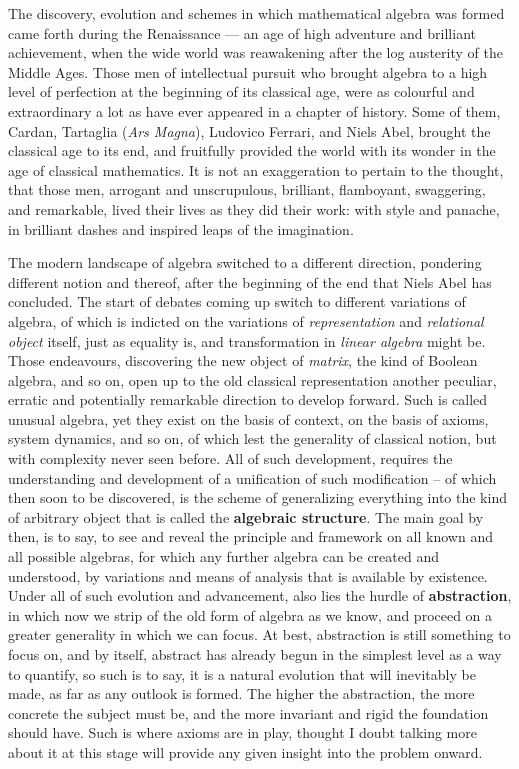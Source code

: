The discovery, evolution and schemes in which mathematical algebra was formed came forth during the Renaissance --- an age of high adventure and brilliant achievement, when the wide world was reawakening after the log austerity of the Middle Ages. Those men of intellectual pursuit who brought algebra to a high level of perfection at the beginning of its classical age, were as colourful and extraordinary a lot as have ever appeared in a chapter of history. Some of them, Cardan, Tartaglia (\textit{Ars Magna}), Ludovico Ferrari, and Niels Abel, brought the classical age to its end, and fruitfully provided the world with its wonder in the age of classical mathematics. It is not an exaggeration to pertain to the thought, that those men, arrogant and unscrupulous, brilliant, flamboyant, swaggering, and remarkable, lived their lives as they did their work: with style and panache, in brilliant dashes and inspired leaps of the imagination.

The modern landscape of algebra switched to a different direction, pondering different notion and thereof, after the beginning of the end that Niels Abel has concluded. The start of debates coming up switch to different variations of algebra, of which is indicted on the variations of \textit{representation} and \textit{relational object} itself, just as equality is, and transformation in \textit{linear algebra} might be. Those endeavours, discovering the new object of \textit{matrix}, the kind of Boolean algebra, and so on, open up to the old classical representation another peculiar, erratic and potentially remarkable direction to develop forward. Such is called unusual algebra, yet they exist on the basis of context, on the basis of axioms, system dynamics, and so on, of which lest the generality of classical notion, but with complexity never seen before. All of such development, requires the understanding and development of a unification of such modification -- of which then soon to be discovered, is the scheme of generalizing everything into the kind of arbitrary object that is called the \textbf{algebraic structure}. The main goal by then, is to say, to see and reveal the principle and framework on all known and all possible algebras, for which any further algebra can be created and understood, by variations and means of analysis that is available by existence. Under all of such evolution and advancement, also lies the hurdle of \textbf{abstraction}, in which now we strip of the old form of algebra as we know, and proceed on a greater generality in which we can focus. At best, abstraction is still something to focus on, and by itself, abstract has already begun in the simplest level as a way to quantify, so such is to say, it is a natural evolution that will inevitably be made, as far as any outlook is formed. The higher the abstraction, the more concrete the subject must be, and the more invariant and rigid the foundation should have. Such is where axioms are in play, thought I doubt talking more about it at this stage will provide any given insight into the problem onward. 

